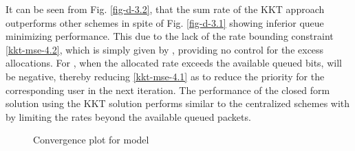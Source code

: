 It can be seen from Fig. \ref{fig-d-3.2}, that the sum rate of the  \ac{KKT} approach outperforms other schemes in spite of Fig. \ref{fig-d-3.1} showing inferior queue minimizing performance. This due to the lack of the rate bounding constraint \eqref{kkt-mse-4.2}, which is simply given by , providing no control for the excess allocations. For , when the allocated rate exceeds the available queued bits,  will be negative, thereby reducing \eqref{kkt-mse-4.1} as  to reduce the priority for the corresponding user in the next iteration. The performance of the closed form solution using the \ac{KKT} solution performs similar to the centralized schemes with  by limiting the rates beyond the available queued packets.
\begin{figure*}
\centering
{}
\hfill
{}
\caption{Convergence plot for  model}
\label{fig-d-3}
\end{figure*}
